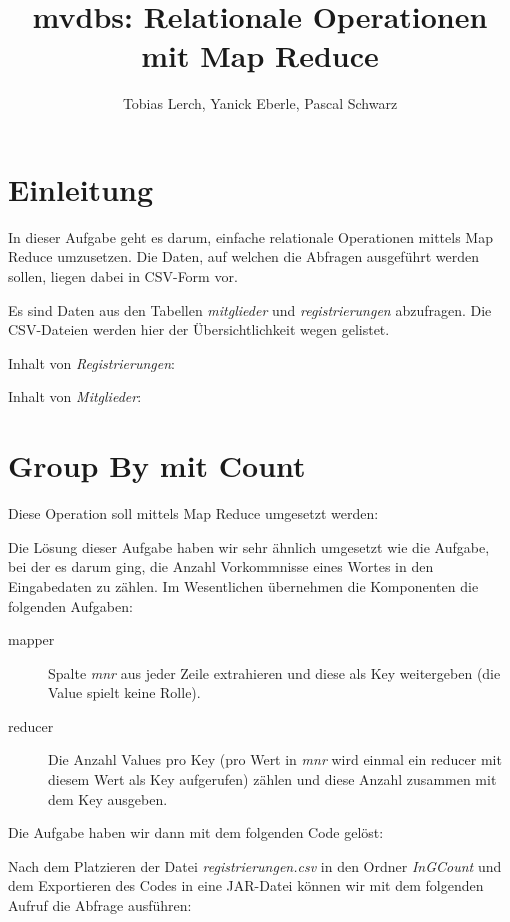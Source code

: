 \documentclass[11pt,a4paper,parskip=half]{scrartcl}
\title{mvdbs: Relationale Operationen mit Map Reduce}
\author{Tobias Lerch, Yanick Eberle, Pascal Schwarz}
\begin{document}
\maketitle

\pagestyle{fancy}
\section{Einleitung}
In dieser Aufgabe geht es darum, einfache relationale Operationen mittels Map Reduce umzusetzen. Die Daten, auf welchen die Abfragen ausgeführt werden sollen, liegen dabei in CSV-Form vor.

Es sind Daten aus den Tabellen \emph{mitglieder} und \emph{registrierungen} abzufragen. Die CSV-Dateien werden hier der Übersichtlichkeit wegen gelistet.

Inhalt von \emph{Registrierungen}:


Inhalt von \emph{Mitglieder}:


\section{Group By mit Count}
Diese Operation soll mittels Map Reduce umgesetzt werden:


Die Lösung dieser Aufgabe haben wir sehr ähnlich umgesetzt wie die Aufgabe, bei der es darum ging, die Anzahl Vorkommnisse eines Wortes in den Eingabedaten zu zählen. Im Wesentlichen übernehmen die Komponenten die folgenden Aufgaben:

\begin{description}
	\item[mapper] Spalte \emph{mnr} aus jeder Zeile extrahieren und diese als Key weitergeben (die Value spielt keine Rolle).
	\item[reducer] Die Anzahl Values pro Key (pro Wert in \emph{mnr} wird einmal ein reducer mit diesem Wert als Key aufgerufen) zählen und diese Anzahl zusammen mit dem Key ausgeben.
\end{description}

Die Aufgabe haben wir dann mit dem folgenden Code gelöst:


Nach dem Platzieren der Datei \emph{registrierungen.csv} in den Ordner \emph{InGCount} und dem Exportieren des Codes in eine JAR-Datei können wir mit dem folgenden Aufruf die Abfrage ausführen:

\end{document}
